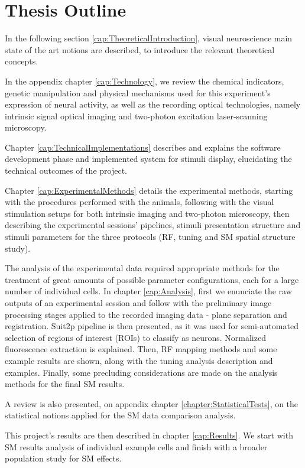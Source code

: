 \section{Thesis Outline}
\label{sec:int_outline}

In the following section \ref{cap:TheoreticalIntroduction}, visual neuroscience main state of the art notions are described, to introduce the relevant theoretical concepts. 

In the appendix chapter \ref{cap:Technology}, we review the chemical indicators, genetic manipulation and physical mechanisms used for this experiment's expression of neural activity, as well as the recording optical technologies, namely intrinsic signal optical imaging and two-photon excitation laser-scanning microscopy.

Chapter \ref{cap:TechnicalImplementations} describes and explains the software development phase and implemented system for stimuli display, elucidating the technical outcomes of the project.

Chapter \ref{cap:ExperimentalMethods} details the experimental methods, starting with the procedures performed with the animals, following with the visual stimulation setups for both intrinsic imaging and two-photon microscopy, then describing the experimental sessions' pipelines, stimuli presentation structure and stimuli parameters for the three protocols (RF, tuning and SM spatial structure study).

The analysis of the experimental data required appropriate methods for the treatment of great amounts of possible parameter configurations, each for a large number of individual cells. In chapter \ref{cap:Analysis}, first we enunciate the raw outputs of an experimental session and follow with the preliminary image processing stages applied to the recorded imaging data - plane separation and registration. Suit2p pipeline is then presented, as it was used for semi-automated selection of regions of interest (ROIs) to classify as neurons. Normalized fluorescence extraction is explained. Then, RF mapping methods and some example results are shown, along with the tuning analysis description and examples. Finally, some precluding considerations are made on the analysis methods for the final SM results.

A review is also presented, on appendix chapter \ref{chapter:StatisticalTests}, on the statistical notions applied for the SM data comparison analysis.

This project's results are then described in chapter \ref{cap:Results}. We start with SM results analysis of individual example cells and finish with a broader population study for SM effects.

